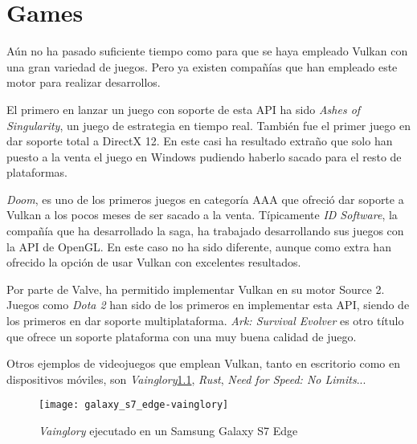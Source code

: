\chapter{Games}
Aún no ha pasado suficiente tiempo como para que se haya empleado Vulkan con una gran variedad de juegos. Pero ya
existen compañías que han empleado este motor para realizar desarrollos.

El primero en lanzar un juego con soporte de esta API ha sido \emph{Ashes of Singularity}, un juego de estrategia en
tiempo real. También fue el primer juego en dar soporte total a DirectX 12. En este casi ha resultado extraño que solo
han puesto a la venta el juego en Windows pudiendo haberlo sacado para el resto de plataformas.

\emph{Doom}, es uno de los primeros juegos en categoría AAA que  ofreció dar soporte a Vulkan a los pocos meses de ser
sacado a la venta. Típicamente \emph{ID Software}, la compañía que ha desarrollado la saga, ha trabajado desarrollando
sus juegos con la API de OpenGL. En este caso no ha sido diferente, aunque como extra han ofrecido la opción de usar
Vulkan con excelentes resultados.

Por parte de Valve, ha permitido implementar Vulkan en su motor Source 2. Juegos como \emph{Dota 2} han sido de los
primeros en implementar esta API, siendo de los primeros en dar soporte multiplataforma. \emph{Ark: Survival Evolver}
es otro título que ofrece un soporte plataforma con una muy buena calidad de juego.

Otros ejemplos de videojuegos que emplean Vulkan, tanto en escritorio como en dispositivos móviles, son
\emph{Vainglory}\ref{fig:vainglory}, \emph{Rust}, \emph{Need for Speed: No Limits}...

\begin{figure}[t]
	\begin{center}
		\texttt{[image: galaxy\_s7\_edge-vainglory]}
		\caption{\emph{Vainglory} ejecutado en un Samsung Galaxy S7 Edge}
		\label{fig:vainglory}
	\end{center}
\end{figure}
